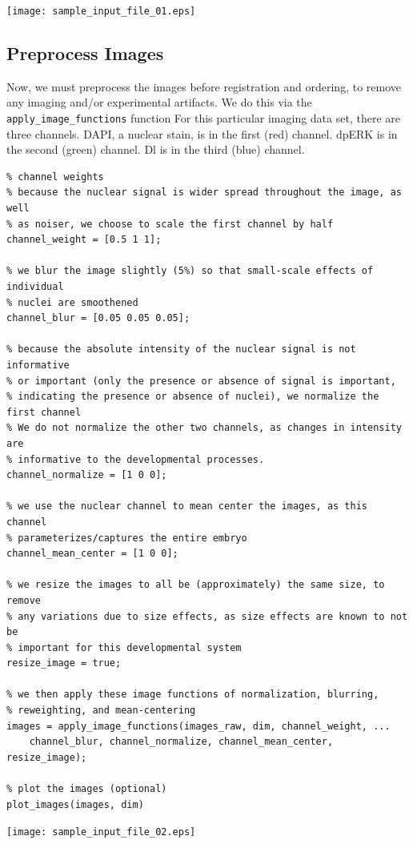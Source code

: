 \documentclass[12pt]{article}
\begin{document}
\texttt{[image: sample\_input\_file\_01.eps]}


\subsection*{Preprocess Images}

\begin{par}
Now, we must preprocess the images before registration and ordering, to remove any imaging and/or experimental artifacts. We do this via the \texttt{apply\_image\_functions} function For this particular imaging data set, there are three channels. DAPI, a nuclear stain, is in the first (red) channel. dpERK is in the second (green) channel. Dl is in the third (blue) channel.
\end{par} \vspace{1em}
\begin{verbatim}
% channel weights
% because the nuclear signal is wider spread throughout the image, as well
% as noiser, we choose to scale the first channel by half
channel_weight = [0.5 1 1];

% we blur the image slightly (5%) so that small-scale effects of individual
% nuclei are smoothened
channel_blur = [0.05 0.05 0.05];

% because the absolute intensity of the nuclear signal is not informative
% or important (only the presence or absence of signal is important,
% indicating the presence or absence of nuclei), we normalize the first channel
% We do not normalize the other two channels, as changes in intensity are
% informative to the developmental processes.
channel_normalize = [1 0 0];

% we use the nuclear channel to mean center the images, as this channel
% parameterizes/captures the entire embryo
channel_mean_center = [1 0 0];

% we resize the images to all be (approximately) the same size, to remove
% any variations due to size effects, as size effects are known to not be
% important for this developmental system
resize_image = true;

% we then apply these image functions of normalization, blurring,
% reweighting, and mean-centering
images = apply_image_functions(images_raw, dim, channel_weight, ...
    channel_blur, channel_normalize, channel_mean_center, resize_image);

% plot the images (optional)
plot_images(images, dim)
\end{verbatim}

\texttt{[image: sample\_input\_file\_02.eps]}
\end{document}
